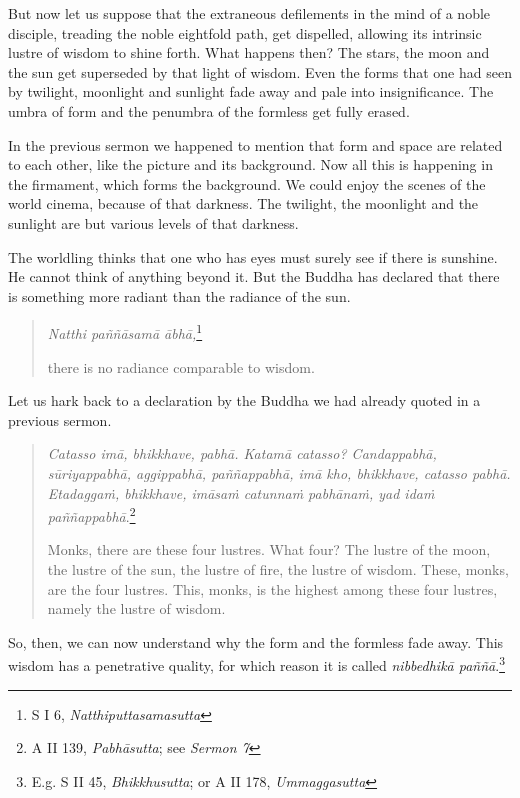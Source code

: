 \enlargethispage{\baselineskip}

But now let us suppose that the extraneous defilements in the mind of a noble disciple, treading the noble eightfold path, get dispelled, allowing its intrinsic lustre of wisdom to shine forth. What happens then? The stars, the moon and the sun get superseded by that light of wisdom. Even the forms that one had seen by twilight, moonlight and sunlight fade away and pale into insignificance. The umbra of form and the penumbra of the formless get fully erased.

In the previous sermon we happened to mention that form and space are related to each other, like the picture and its background. Now all this is happening in the firmament, which forms the background. We could enjoy the scenes of the world cinema, because of that darkness. The twilight, the moonlight and the sunlight are but various levels of that darkness.

The worldling thinks that one who has eyes must surely see if there is sunshine. He cannot think of anything beyond it. But the Buddha has declared that there is something more radiant than the radiance of the sun.

\begin{quote}
\emph{Natthi paññāsamā ābhā,}\footnote{S I 6, \emph{Natthiputtasamasutta}}

there is no radiance comparable to wisdom.
\end{quote}

Let us hark back to a declaration by the Buddha we had already quoted in a previous sermon.

\begin{quote}
\emph{Catasso imā, bhikkhave, pabhā. Katamā catasso? Candappabhā, sūriyappabhā, aggippabhā, paññappabhā, imā kho, bhikkhave, catasso pabhā. Etadaggaṁ, bhikkhave, imāsaṁ catunnaṁ pabhānaṁ, yad idaṁ paññappabhā}.\footnote{A II 139, \emph{Pabhāsutta}; see \emph{Sermon 7}}

Monks, there are these four lustres. What four? The lustre of the moon, the lustre of the sun, the lustre of fire, the lustre of wisdom. These, monks, are the four lustres. This, monks, is the highest among these four lustres, namely the lustre of wisdom.
\end{quote}

So, then, we can now understand why the form and the formless fade away. This wisdom has a penetrative quality, for which reason it is called \emph{nibbedhikā paññā}.\footnote{E.g. S II 45, \emph{Bhikkhusutta}; or A II 178, \emph{Ummaggasutta}}

